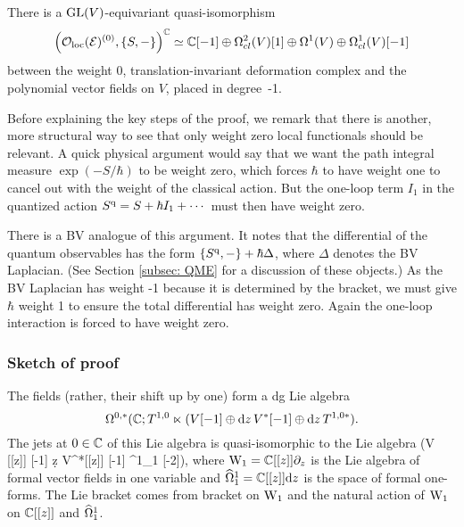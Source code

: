 \begin{lem}
\label{lem: def complex wt zero} 
There is a ${\rm GL}(V)$-equivariant quasi-isomorphism
\[
\left(\mathcal{O}_{\rm loc}(\mathcal E)^{(0)}, \{S,-\}\right)^{\mathbb C} \simeq \mathbb C[-1] \oplus \Omega^2_{cl}(V)[1] \oplus \Omega^1(V) \oplus \Omega^1_{cl}(V)[-1] 
\]
between the weight 0, translation-invariant deformation complex 
and the polynomial vector fields on $V$, placed in degree~-1.
\end{lem}

Before explaining the key steps of the proof, 
we remark that there is another, more structural way to see that only weight zero local functionals should be relevant.
A quick physical argument would say that we want the path integral measure $\exp(-S/\hbar)$ to be weight zero,
which forces $\hbar$ to have weight one to cancel out with the weight of the classical action.
But the one-loop term $I_1$ in the quantized action $S^{\rm q} = S + \hbar I_1 + \cdots$ must then have weight zero.

There is a BV analogue of this argument.
It notes that the differential of the quantum observables has the form $\{S^{\rm q},-\} + \hbar \Delta$,
where $\Delta$ denotes the BV Laplacian.
(See Section \ref{subsec: QME} for a discussion of these objects.)
As the BV Laplacian has weight -1 because it is determined by the bracket,
we must give $\hbar$ weight 1 to ensure the total differential has weight zero.
Again the one-loop interaction is forced to have weight zero.


\subsubsection{Sketch of proof}

The fields (rather, their shift up by one) form a dg Lie algebra
\[
\Omega^{0,*}(\mathbb C ; T^{1,0} \ltimes (V[-1] \oplus {\rm d} z \,V^*[-1] \oplus {\rm d} z \,T^{1,0 *}).
\]
The jets at $0 \in \mathbb C$ of this Lie algebra is quasi-isomorphic to the Lie algebra
\be\label{jet lie}
\wone \ltimes (V [[z]] [-1] \oplus \d z V^*[[z]] [-1] \oplus \hOmega^1_1 [-2]),
\ee
where ${\rm W}_1 = \mathbb C [[z]] \partial_z$ is the Lie algebra of formal vector fields in one variable and $\widehat{\Omega}^1_1 = \mathbb C [[z]] {\rm d} z$ is the space of formal one-forms. 
The Lie bracket comes from bracket on ${\rm W}_1$ and the natural action of ${\rm W}_1$ on $\mathbb C [[z]]$ and $\widehat{\Omega}^1_1$. 


